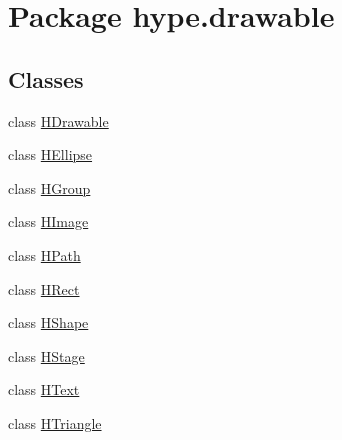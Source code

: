 \hypertarget{namespacehype_1_1drawable}{\section{Package hype.\-drawable}
\label{namespacehype_1_1drawable}
}
\subsection*{Classes}
\begin{DoxyCompactItemize}
\item 
class \hyperlink{classhype_1_1drawable_1_1_h_drawable}{H\-Drawable}
\item 
class \hyperlink{classhype_1_1drawable_1_1_h_ellipse}{H\-Ellipse}
\item 
class \hyperlink{classhype_1_1drawable_1_1_h_group}{H\-Group}
\item 
class \hyperlink{classhype_1_1drawable_1_1_h_image}{H\-Image}
\item 
class \hyperlink{classhype_1_1drawable_1_1_h_path}{H\-Path}
\item 
class \hyperlink{classhype_1_1drawable_1_1_h_rect}{H\-Rect}
\item 
class \hyperlink{classhype_1_1drawable_1_1_h_shape}{H\-Shape}
\item 
class \hyperlink{classhype_1_1drawable_1_1_h_stage}{H\-Stage}
\item 
class \hyperlink{classhype_1_1drawable_1_1_h_text}{H\-Text}
\item 
class \hyperlink{classhype_1_1drawable_1_1_h_triangle}{H\-Triangle}
\end{DoxyCompactItemize}
